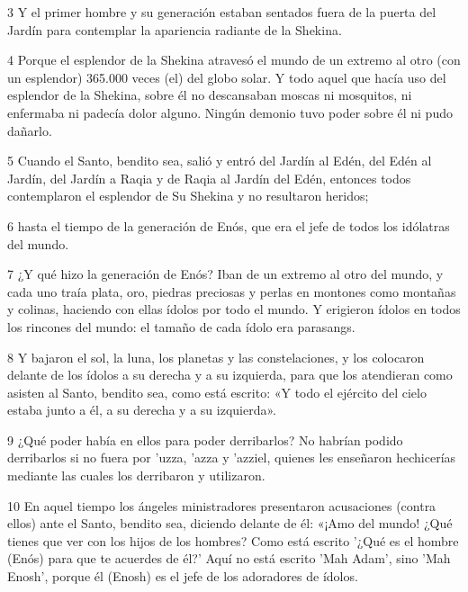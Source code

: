 \par 3 Y el primer hombre y su generación estaban sentados fuera de la puerta del Jardín para contemplar la apariencia radiante de la Shekina.

\par 4 Porque el esplendor de la Shekina atravesó el mundo de un extremo al otro (con un esplendor) 365.000 veces (el) del globo solar. Y todo aquel que hacía uso del esplendor de la Shekina, sobre él no descansaban moscas ni mosquitos, ni enfermaba ni padecía dolor alguno. Ningún demonio tuvo poder sobre él ni pudo dañarlo.

\par 5 Cuando el Santo, bendito sea, salió y entró del Jardín al Edén, del Edén al Jardín, del Jardín a Raqia y de Raqia al Jardín del Edén, entonces todos contemplaron el esplendor de Su Shekina y no resultaron heridos;

\par 6 hasta el tiempo de la generación de Enós, que era el jefe de todos los idólatras del mundo.

\par 7 ¿Y qué hizo la generación de Enós? Iban de un extremo al otro del mundo, y cada uno traía plata, oro, piedras preciosas y perlas en montones como montañas y colinas, haciendo con ellas ídolos por todo el mundo. Y erigieron ídolos en todos los rincones del mundo: el tamaño de cada ídolo era parasangs.

\par 8 Y bajaron el sol, la luna, los planetas y las constelaciones, y los colocaron delante de los ídolos a su derecha y a su izquierda, para que los atendieran como asisten al Santo, bendito sea, como está escrito: «Y todo el ejército del cielo estaba junto a él, a su derecha y a su izquierda».

\par 9 ¿Qué poder había en ellos para poder derribarlos? No habrían podido derribarlos si no fuera por 'uzza, 'azza y 'azziel, quienes les enseñaron hechicerías mediante las cuales los derribaron y utilizaron.

\par 10 En aquel tiempo los ángeles ministradores presentaron acusaciones (contra ellos) ante el Santo, bendito sea, diciendo delante de él: «¡Amo del mundo! ¿Qué tienes que ver con los hijos de los hombres? Como está escrito '¿Qué es el hombre (Enós) para que te acuerdes de él?' Aquí no está escrito 'Mah Adam', sino 'Mah Enosh', porque él (Enosh) es el jefe de los adoradores de ídolos.

